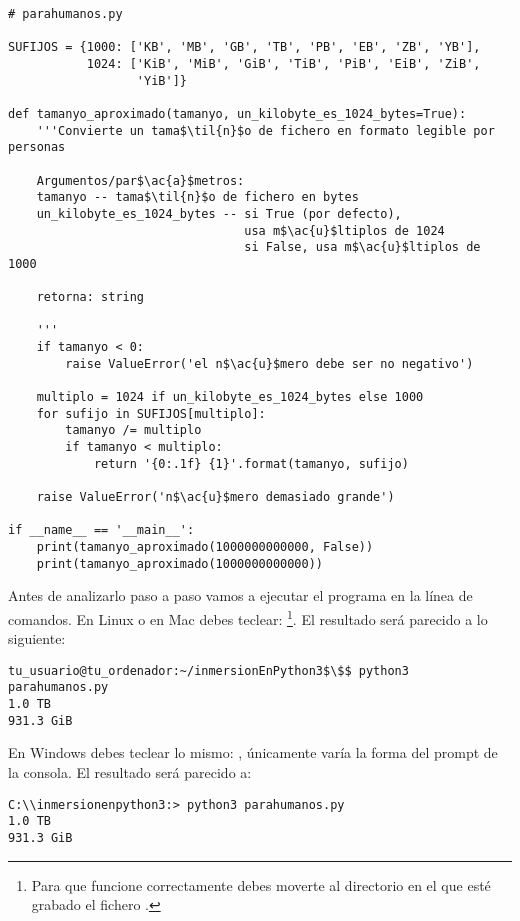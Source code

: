 \begin{lstlisting}[mathescape=True]
# parahumanos.py

SUFIJOS = {1000: ['KB', 'MB', 'GB', 'TB', 'PB', 'EB', 'ZB', 'YB'],
           1024: ['KiB', 'MiB', 'GiB', 'TiB', 'PiB', 'EiB', 'ZiB', 
                  'YiB']}

def tamanyo_aproximado(tamanyo, un_kilobyte_es_1024_bytes=True):
    '''Convierte un tama$\til{n}$o de fichero en formato legible por personas

    Argumentos/par$\ac{a}$metros:
    tamanyo -- tama$\til{n}$o de fichero en bytes
    un_kilobyte_es_1024_bytes -- si True (por defecto), 
                                 usa m$\ac{u}$ltiplos de 1024
                                 si False, usa m$\ac{u}$ltiplos de 1000

    retorna: string

    '''
    if tamanyo < 0:
        raise ValueError('el n$\ac{u}$mero debe ser no negativo')

    multiplo = 1024 if un_kilobyte_es_1024_bytes else 1000
    for sufijo in SUFIJOS[multiplo]:
        tamanyo /= multiplo
        if tamanyo < multiplo:
            return '{0:.1f} {1}'.format(tamanyo, sufijo)

    raise ValueError('n$\ac{u}$mero demasiado grande')

if __name__ == '__main__':
    print(tamanyo_aproximado(1000000000000, False))
    print(tamanyo_aproximado(1000000000000))

\end{lstlisting}

Antes de analizarlo paso a paso vamos a ejecutar el programa en la línea de comandos. En Linux o en Mac debes teclear: \footnote{Para que funcione correctamente debes moverte al directorio en el que esté grabado el fichero .}. El resultado será parecido a lo siguiente:

\begin{lstlisting}
tu_usuario@tu_ordenador:~/inmersionEnPython3$\$$ python3 parahumanos.py
1.0 TB
931.3 GiB
\end{lstlisting}

En Windows debes teclear lo mismo: , únicamente varía la forma del prompt de la consola. El resultado será parecido a:

\begin{lstlisting}
C:\\inmersionenpython3:> python3 parahumanos.py
1.0 TB
931.3 GiB
\end{lstlisting}


